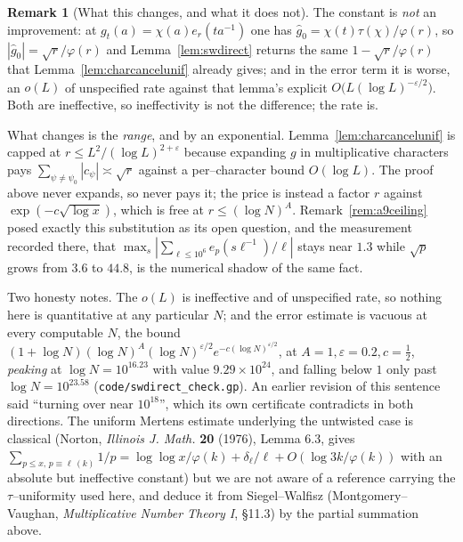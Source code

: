 \documentclass[11pt]{article}
\theoremstyle{definition}
\newtheorem{remark}[theorem]{Remark}
\begin{document}
\begin{remark}[What this changes, and what it does not]\label{rem:swdirectscope}
The constant is \emph{not} an improvement: at $g_t(a)=\chi(a)e_r(ta^{-1})$ one has
$\widehat g_0=\chi(t)\tau(\chi)/\varphi(r)$, so $|\widehat g_0|=\sqrt r/\varphi(r)$ and
Lemma~\ref{lem:swdirect} returns the same $1-\sqrt r/\varphi(r)$ that
Lemma~\ref{lem:charcancelunif} already gives; and in the error term it is worse, an $o(L)$ of
unspecified rate against that lemma's explicit $O\bigl(L(\log L)^{-\varepsilon/2}\bigr)$. Both are
ineffective, so ineffectivity is not the difference; the rate is.

What changes is the \emph{range}, and by an exponential. Lemma~\ref{lem:charcancelunif} is capped at
$r\le L^2/(\log L)^{2+\varepsilon}$ because expanding $g$ in multiplicative characters pays
$\sum_{\psi\ne\psi_0}|c_\psi|\asymp\sqrt r$ against a per--character bound $O(\log L)$. The proof
above never expands, so never pays it; the price is instead a factor $r$ against
$\exp(-c\sqrt{\log x})$, which is free at $r\le(\log N)^A$. Remark~\ref{rem:a9ceiling} posed exactly
this substitution as its open question, and the measurement recorded there, that
$\max_s|\sum_{\ell\le10^6}e_p(s\ell^{-1})/\ell|$ stays near $1.3$ while $\sqrt p$ grows from $3.6$
to $44.8$, is the numerical shadow of the same fact.

Two honesty notes. The $o(L)$ is ineffective and of unspecified rate, so nothing here is
quantitative at any particular $N$; and the error estimate is vacuous at every computable $N$, the
bound $(1+\log N)(\log N)^{A}(\log N)^{\varepsilon/2}e^{-c(\log N)^{\varepsilon/2}}$, at
$A=1,\varepsilon=0.2,c=\tfrac12$, \emph{peaking} at $\log N=10^{16.23}$ with value
$9.29\times10^{24}$, and falling below $1$ only past $\log N=10^{23.58}$
\textup{(\texttt{code/swdirect\_check.gp})}. An earlier revision of this sentence said ``turning over
near $10^{18}$'', which its own certificate contradicts in both directions. The uniform Mertens estimate underlying the untwisted
case is classical (Norton, \emph{Illinois J. Math.} \textbf{20} (1976), Lemma 6.3, gives
$\sum_{p\le x,\,p\equiv\ell\,(k)}1/p=\log\log x/\varphi(k)+\delta_\ell/\ell+O(\log 3k/\varphi(k))$
with an absolute but ineffective constant) but we are not aware of a reference carrying the
$\tau$--uniformity used here, and deduce it from Siegel--Walfisz \textup{(}Montgomery--Vaughan,
\emph{Multiplicative Number Theory I}, \S11.3\textup{)} by the partial summation above.
\end{remark}
\end{document}
